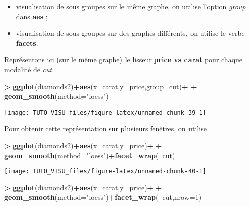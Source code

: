 \documentclass[]{book}
\newenvironment{Shaded}{\begin{snugshade}}{\end{snugshade}}
\newcommand{\DataTypeTok}[1]{\textcolor[rgb]{0.13,0.29,0.53}{#1}}
\newcommand{\DecValTok}[1]{\textcolor[rgb]{0.00,0.00,0.81}{#1}}
\newcommand{\KeywordTok}[1]{\textcolor[rgb]{0.13,0.29,0.53}{\textbf{#1}}}
\newcommand{\NormalTok}[1]{#1}
\newcommand{\OperatorTok}[1]{\textcolor[rgb]{0.81,0.36,0.00}{\textbf{#1}}}
\newcommand{\StringTok}[1]{\textcolor[rgb]{0.31,0.60,0.02}{#1}}
\providecommand{\tightlist}{%
  \setlength{\itemsep}{0pt}\setlength{\parskip}{0pt}}
\theoremstyle{definition}
\theoremstyle{definition}
\theoremstyle{definition}
\theoremstyle{remark}
\begin{document}
\begin{itemize}
\tightlist
\item
  visualisation de sous groupes sur le même graphe, on utilise l'option \emph{group} dans \textbf{aes} ;
\item
  visualisation de sous groupes sur des graphes différents, on utilise le verbe \textbf{facets}.
\end{itemize}

Représentons ici (sur le même graphe) le lisseur \textbf{price vs carat} pour chaque modalité de \emph{cut}

\begin{Shaded}
\begin{Highlighting}[]
\OperatorTok{>}\StringTok{ }\KeywordTok{ggplot}\NormalTok{(diamonds2)}\OperatorTok{+}\KeywordTok{aes}\NormalTok{(}\DataTypeTok{x=}\NormalTok{carat,}\DataTypeTok{y=}\NormalTok{price,}\DataTypeTok{group=}\NormalTok{cut)}\OperatorTok{+}
\OperatorTok{+}\StringTok{   }\KeywordTok{geom_smooth}\NormalTok{(}\DataTypeTok{method=}\StringTok{"loess"}\NormalTok{)}
\end{Highlighting}
\end{Shaded}

\begin{center}\texttt{[image: TUTO\_VISU\_files/figure-latex/unnamed-chunk-39-1]} \end{center}

Pour obtenir cette représentation sur plusieurs fenêtres, on utilise

\begin{Shaded}
\begin{Highlighting}[]
\OperatorTok{>}\StringTok{ }\KeywordTok{ggplot}\NormalTok{(diamonds2)}\OperatorTok{+}\KeywordTok{aes}\NormalTok{(}\DataTypeTok{x=}\NormalTok{carat,}\DataTypeTok{y=}\NormalTok{price)}\OperatorTok{+}
\OperatorTok{+}\StringTok{   }\KeywordTok{geom_smooth}\NormalTok{(}\DataTypeTok{method=}\StringTok{"loess"}\NormalTok{)}\OperatorTok{+}\KeywordTok{facet_wrap}\NormalTok{(}\OperatorTok{~}\NormalTok{cut)}
\end{Highlighting}
\end{Shaded}

\begin{center}\texttt{[image: TUTO\_VISU\_files/figure-latex/unnamed-chunk-40-1]} \end{center}

\begin{Shaded}
\begin{Highlighting}[]
\OperatorTok{>}\StringTok{ }\KeywordTok{ggplot}\NormalTok{(diamonds2)}\OperatorTok{+}\KeywordTok{aes}\NormalTok{(}\DataTypeTok{x=}\NormalTok{carat,}\DataTypeTok{y=}\NormalTok{price)}\OperatorTok{+}
\OperatorTok{+}\StringTok{   }\KeywordTok{geom_smooth}\NormalTok{(}\DataTypeTok{method=}\StringTok{"loess"}\NormalTok{)}\OperatorTok{+}\KeywordTok{facet_wrap}\NormalTok{(}\OperatorTok{~}\NormalTok{cut,}\DataTypeTok{nrow=}\DecValTok{1}\NormalTok{)}
\end{Highlighting}
\end{Shaded}
\end{document}
